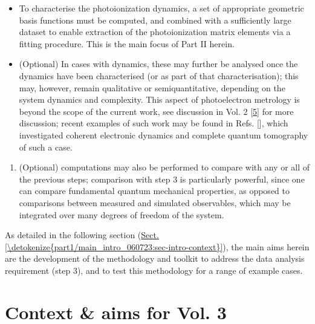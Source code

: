 \documentclass[letterpaper,table,10pt,english]{jupyterBook}
\begin{document}
\begin{enumerate}
\begin{itemize}
\item {} 
\sphinxAtStartPar
To characterise the  photoionization dynamics, a set of appropriate geometric basis functions must be computed, and combined with a sufficiently large dataset to enable extraction of the photoionization matrix elements via a fitting procedure. This is the main focus of Part II herein.

\item {} 
\sphinxAtStartPar
(Optional) In cases with  dynamics, these may further be analysed once the  dynamics have been characterised (or as part of that characterisation); this may, however, remain qualitative or semi\sphinxhyphen{}quantitative, depending on the system dynamics and complexity. This aspect of photoelectron metrology is beyond the scope of the current work, see discussion in  Vol. 2 {[}\hyperlink{cite.backmatter/bibliography:id664}{5}{]} for more discussion; recent examples of such work may be found in Refs. {[}{]}, which investigated coherent electronic dynamics and complete quantum tomography of such a case.

\end{itemize}

\end{enumerate}
\begin{enumerate}
%
\setcounter{enumi}{3}
\item {} 
\sphinxAtStartPar
(Optional)  computations may also be performed to compare with any or all of the previous steps; comparison with step 3 is particularly powerful, since one can compare fundamental quantum mechanical properties, as opposed to comparisons between measured and simulated observables, which may be integrated over many degrees of freedom of the system.

\end{enumerate}

\sphinxAtStartPar
As detailed in the following section (\hyperref[\detokenize{part1/main_intro_060723:sec-intro-context}]{Sect.\@ \ref{\detokenize{part1/main_intro_060723:sec-intro-context}}}), the main aims herein are the development of the methodology and toolkit to address the data analysis requirement (step 3), and to test this methodology for a range of example cases.


\section{Context \& aims for Vol. 3}
\label{\detokenize{part1/main_intro_060723:context-aims-for-vol-3}}\label{\detokenize{part1/main_intro_060723:sec-intro-context}}
\end{document}
